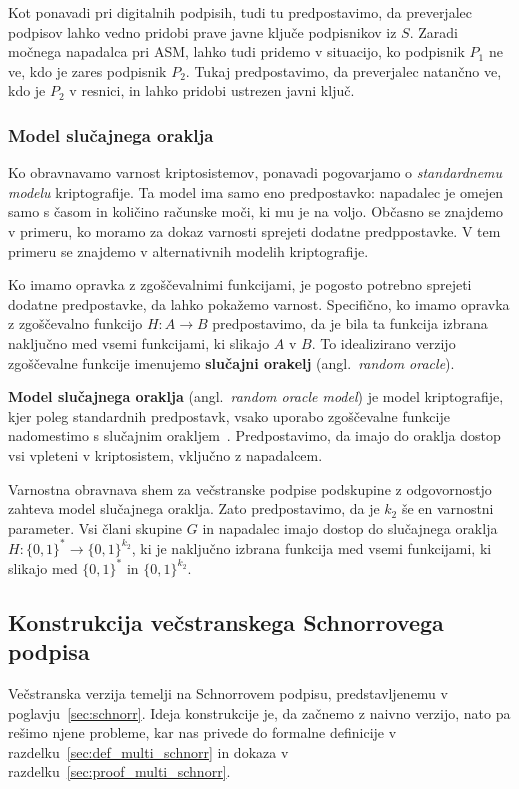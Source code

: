 \documentclass[isrm2, tisk]{fmfdelo}
\begin{document}
Kot ponavadi pri digitalnih podpisih, tudi tu predpostavimo, da preverjalec podpisov lahko vedno 
pridobi prave javne ključe podpisnikov iz $S$. Zaradi močnega napadalca pri ASM, lahko tudi pridemo 
v situacijo, ko podpisnik $P_1$ ne ve, kdo je zares podpisnik $P_2$. Tukaj predpostavimo, da preverjalec
natančno ve, kdo je $P_2$ v resnici, in lahko pridobi ustrezen javni ključ. 

\subsubsection{Model slučajnega oraklja}
Ko obravnavamo varnost kriptosistemov, ponavadi pogovarjamo o \textit{standardnemu modelu} kriptografije. 
Ta model ima samo eno predpostavko: napadalec je omejen samo s časom in količino računske moči, ki mu 
je na voljo. Občasno se znajdemo v primeru, ko moramo za dokaz varnosti sprejeti dodatne predppostavke. 
V tem primeru se znajdemo v alternativnih modelih kriptografije. 

Ko imamo opravka z zgoščevalnimi funkcijami, je pogosto potrebno sprejeti dodatne predpostavke, da lahko 
pokažemo varnost. Specifično, ko imamo opravka z zgoščevalno funkcijo $H: A \rightarrow B$ predpostavimo, 
da je bila ta funkcija izbrana naključno med vsemi funkcijami, ki slikajo $A$ v $B$. To idealizirano 
verzijo zgoščevalne funkcije imenujemo \textbf{slučajni orakelj} (angl.\ \textit{random oracle}).

\textbf{Model slučajnega oraklja} (angl.\ \textit{random oracle model}) je model kriptografije, kjer poleg 
standardnih predpostavk, vsako uporabo zgoščevalne funkcije nadomestimo s slučajnim 
orakljem~\cite{boneh2023appcry}. Predpostavimo, da imajo do oraklja dostop vsi vpleteni v kriptosistem, 
vključno z napadalcem.

\begin{definicija}
    Varnostna obravnava shem za večstranske podpise podskupine z odgovornostjo zahteva model slučajnega 
    oraklja. Zato predpostavimo, da je $k_2$ še en varnostni parameter. Vsi člani skupine $G$ in 
    napadalec imajo dostop do slučajnega oraklja $H: \{0, 1\}^* \rightarrow \{0, 1\}^{k_2}$, ki je 
    naključno izbrana funkcija med vsemi funkcijami, ki slikajo med $\{0, 1\}^*$ in $\{0, 1\}^{k_2}$.
\end{definicija}

\subsection{Konstrukcija večstranskega Schnorrovega podpisa}
Večstranska verzija temelji na Schnorrovem podpisu, predstavljenemu v poglavju~\ref{sec:schnorr}. 
Ideja konstrukcije je, da začnemo z naivno verzijo, nato pa rešimo njene probleme, kar nas 
privede do formalne definicije v razdelku~\ref{sec:def_multi_schnorr} in dokaza v 
razdelku~\ref{sec:proof_multi_schnorr}.
\end{document}
